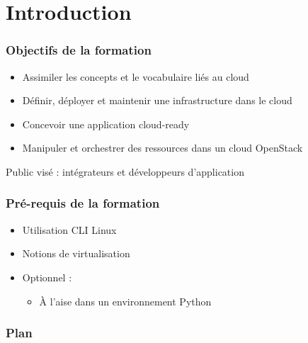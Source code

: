   \section*{Introduction}
  \begin{frame}
    \frametitle{Objectifs de la formation}
    \begin{itemize}
      \item Assimiler les concepts et le vocabulaire liés au cloud
      \item Définir, déployer et maintenir une infrastructure dans le cloud
      \item Concevoir une application cloud-ready
      \item Manipuler et orchestrer des ressources dans un cloud OpenStack
    \end{itemize}
    Public visé : intégrateurs et développeurs d'application
  \end{frame}

  \begin{frame}
    \frametitle{Pré-requis de la formation}
    \begin{itemize}
      \item Utilisation CLI Linux
      \item Notions de virtualisation
      \item Optionnel :
      \begin{itemize}
        \item À l'aise dans un environnement Python
      \end{itemize}
    \end{itemize}
  \end{frame}

  \begin{frame}
    \frametitle{Plan}
    \tableofcontents[hideallsubsections]
  \end{frame}
